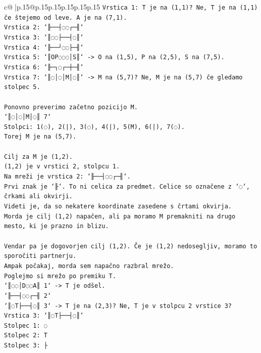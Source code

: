 \documentclass{article}
\begin{document}
{\begin{supertabular}{c@{$\;$}|p{.15\linewidth}@{}p{.15\linewidth}p{.15\linewidth}p{.15\linewidth}p{.15\linewidth}p{.15\linewidth}}
{{{\texttt{Vrstica 1: T je na (1,1)? Ne, T je na (1,1) če štejemo od leve. A je na (7,1).} \\
\texttt{Vrstica 2: `╟──┤◌◌┌─╢`} \\
\texttt{Vrstica 3: `║◌◌├──┤◌║`} \\
\texttt{Vrstica 4: `╟──┘◌◌├─╢`} \\
\texttt{Vrstica 5: `║OP◌◌◌│S║` {-}> O na (1,5), P na (2,5), S na (7,5).} \\
\texttt{Vrstica 6: `╟─┐◌┌─┼─╢`} \\
\texttt{Vrstica 7: `║◌│◌│M│◌║` {-}> M na (5,7)? Ne, M je na (5,7) če gledamo stolpec 5.} \\
\\ 
\texttt{Ponovno preverimo začetno pozicijo M.} \\
\texttt{`║◌│◌│M│◌║ 7`} \\
\texttt{Stolpci: 1(◌), 2(|), 3(◌), 4(|), 5(M), 6(|), 7(◌).} \\
\texttt{Torej M je na (5,7).} \\
\\ 
\texttt{Cilj za M je (1,2).} \\
\texttt{(1,2) je v vrstici 2, stolpcu 1.} \\
\texttt{Na mreži je vrstica 2: `╟──┤◌◌┌─╢`.} \\
\texttt{Prvi znak je `╟`. To ni celica za predmet. Celice so označene z `◌`, črkami ali okvirji.} \\
\texttt{Videti je, da so nekatere koordinate zasedene s črtami okvirja.} \\
\texttt{Morda je cilj (1,2) napačen, ali pa moramo M premakniti na drugo mesto, ki je prazno in blizu.} \\
\\ 
\texttt{Vendar pa je dogovorjen cilj (1,2). Če je (1,2) nedosegljiv, moramo to sporočiti partnerju.} \\
\texttt{Ampak počakaj, morda sem napačno razbral mrežo.} \\
\texttt{Poglejmo si mrežo po premiku T.} \\
\texttt{`║◌◌│D◌◌A║ 1` {-}> T je odšel.} \\
\texttt{`╟──┤◌◌┌─╢ 2`} \\
\texttt{`║◌T├──┤◌║ 3` {-}> T je na (2,3)? Ne, T je v stolpcu 2 vrstice 3?} \\
\texttt{Vrstica 3: `║◌T├──┤◌║`} \\
\texttt{Stolpec 1: ◌} \\
\texttt{Stolpec 2: T} \\
\texttt{Stolpec 3: ├} \\
}}}
\end{supertabular}}
\end{document}
